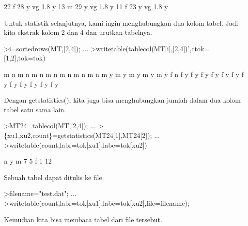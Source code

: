 \documentclass[a4paper,10pt]{article}
\begin{document}
\begin{eulernotebook}
\begin{eulercomment}
\begin{eulercomment}
\begin{eulercomment}
\begin{eulercomment}
\begin{eulercomment}
\begin{eulercomment}
\begin{eulercomment}
\begin{eulercomment}
\begin{eulercomment}
\begin{eulercomment}
\begin{eulercomment}
\begin{eulercomment}
\begin{eulercomment}
\begin{eulercomment}
\begin{eulercomment}
\begin{eulercomment}
\begin{euleroutput}
       22      f     28       y         vg    1.8       y
       13      m     29       y         vg    1.8       y
       11      f     23       y         vg    1.8       y
\end{euleroutput}
\begin{eulercomment}
Untuk statistik selanjutnya, kami ingin menghubungkan dua kolom tabel.
Jadi kita ekstrak kolom 2 dan 4 dan urutkan tabelnya.
\end{eulercomment}
\begin{eulerprompt}
>i=sortedrows(MT,[2,4]); ...
>writetable(tablecol(MT[i],[2,4])',ctok=[1,2],tok=tok)
\end{eulerprompt}
\begin{euleroutput}
           m         n
           m         n
           m         n
           m         n
           m         n
           m         n
           m         n
           m         y
           m         y
           m         y
           m         y
           m         y
           f         n
           f         y
           f         y
           f         y
           f         y
           f         y
           f         y
           f         y
           f         y
           f         y
           f         y
           f         y
           f         y
\end{euleroutput}
\begin{eulercomment}
Dengan getstatistics(), kita juga bisa menghubungkan jumlah dalam dua
kolom tabel satu sama lain.
\end{eulercomment}
\begin{eulerprompt}
>MT24=tablecol(MT,[2,4]); ...
>\{xu1,xu2,count\}=getstatistics(MT24[1],MT24[2]); ...
>writetable(count,labr=tok[xu1],labc=tok[xu2])
\end{eulerprompt}
\begin{euleroutput}
                     n         y
           m         7         5
           f         1        12
\end{euleroutput}
\begin{eulercomment}
Sebuah tabel dapat ditulis ke file.
\end{eulercomment}
\begin{eulerprompt}
>filename="test.dat"; ...
>writetable(count,labr=tok[xu1],labc=tok[xu2],file=filename);
\end{eulerprompt}
\begin{eulercomment}
Kemudian kita bisa membaca tabel dari file tersebut.
\end{eulercomment}
\begin{eulerprompt}

\end{eulerprompt}
\end{eulercomment}
\end{eulercomment}
\end{eulercomment}
\end{eulercomment}
\end{eulercomment}
\end{eulercomment}
\end{eulercomment}
\end{eulercomment}
\end{eulercomment}
\end{eulercomment}
\end{eulercomment}
\end{eulercomment}
\end{eulercomment}
\end{eulercomment}
\end{eulercomment}
\end{eulercomment}
\end{eulernotebook}
\end{document}
